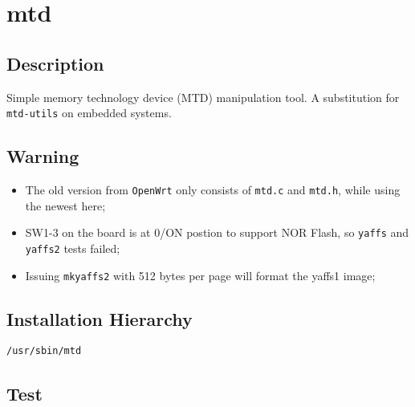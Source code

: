 \documentclass[a4paper]{report}
\begin{document}
\chapter{mtd}
\section{Description}
Simple memory technology device (MTD) manipulation tool. A substitution for
{\tt mtd-utils} on embedded systems.
\section{Warning}
\begin{itemize}
    \item The old version from {\tt OpenWrt} only consists of {\tt mtd.c} and 
          {\tt mtd.h}, while using the newest here;
    \item SW1-3 on the board is at 0/ON postion to support NOR Flash, so
          {\tt yaffs} and {\tt yaffs2} tests failed;
    \item Issuing {\tt mkyaffs2} with 512 bytes per page will format the yaffs1 image;
\end{itemize}
\section{Installation Hierarchy}
\begin{lstlisting}
/usr/sbin/mtd
\end{lstlisting}
\section{Test}
\end{document}
